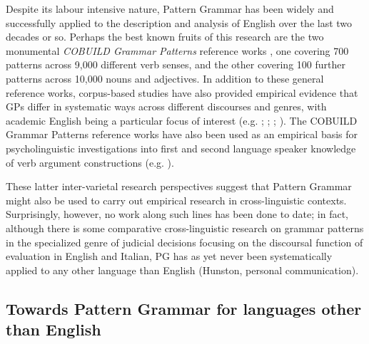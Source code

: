 \documentclass[output=paper]{langscibook}
\begin{document}
Despite its labour intensive nature, Pattern Grammar has been widely and successfully applied to the description and analysis of English over the last two decades or so. Perhaps the best known fruits of this research are the two monumental \textit{COBUILD Grammar Patterns} reference works \citep{FrancisEtAl1996,FrancisEtAl1998}, one covering 700 patterns across 9,000 different verb senses, and the other covering 100 further patterns across 10,000 nouns and adjectives. In addition to these general reference works, corpus-based studies have also provided empirical evidence that GPs differ in systematic ways across different discourses and genres, with academic English being a particular focus of interest (e.g. \citealt{Groom2005}; \citealt{Charles2006, Charles2007}; \citealt{Larsson2016}; \citealt{SuHunston2019}). The COBUILD Grammar Patterns reference works have also been used as an empirical basis for psycholinguistic investigations into first and second language speaker knowledge of verb argument constructions (e.g. \citealt{EllisEtAl2014,RömerEtAl2014,RömerEtAl2015}).

These latter inter-varietal research perspectives suggest that Pattern Grammar might also be used to carry out empirical research in cross-linguistic contexts. Surprisingly, however, no work along such lines has been done to date; in fact, although there is some comparative cross-linguistic research on grammar patterns in the specialized genre of judicial decisions \citep{PontrandolfoGoźdź-Roszkowski2014} focusing on the discoursal function of evaluation in English and Italian, PG has as yet never been systematically applied to any other language than English (Hunston, personal communication).

\subsection{Towards Pattern Grammar for languages other than English}
\end{document}
